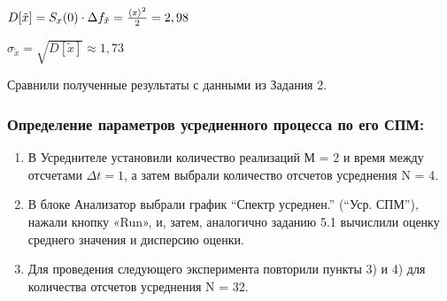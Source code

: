 $D[\tilde{x}] = S_x(0)\cdot \Delta f_{\tilde{x}} =\frac{\langle x\rangle^2}{2} = 2,98$

$\sigma_{\tilde{x}} = \sqrt{D[\tilde{x}]}\approx 1,73$

Сравнили полученные результаты с данными из Задания 2.
\subsubsection[Задание 5.1]{Определение параметров усредненного процесса по его СПМ:}
\begin{enumerate}
	\item В Усреднителе установили количество реализаций М = 2 и время между отсчетами $\Delta t = 1$, а затем выбрали количество отсчетов усреднения N = 4.
	\item В блоке Анализатор выбрали график “Спектр усреднен.” (“Уср. СПМ”), нажали кнопку «Run», и, затем, аналогично заданию 5.1 вычислили оценку среднего значения и дисперсию оценки.
	\item Для проведения следующего эксперимента повторили пункты 3) и 4) для количества отсчетов усреднения N = 32.
\end{enumerate}
